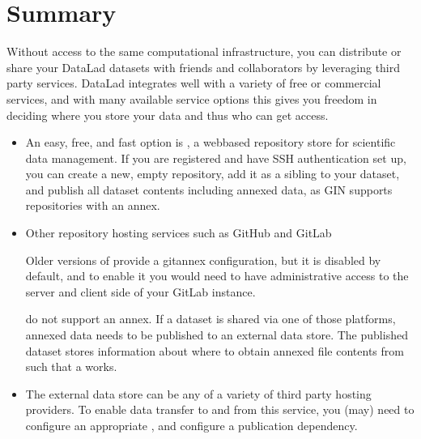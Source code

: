\sphinxstepscope


\section{Summary}
\label{\detokenize{basics/101-140-summary:summary}}\label{\detokenize{basics/101-140-summary:summaryshare}}\label{\detokenize{basics/101-140-summary::doc}}
\sphinxAtStartPar
Without access to the same computational infrastructure, you can distribute or share your
DataLad datasets with friends and collaborators by leveraging third party
services. DataLad integrates well with a variety of free or commercial services,
and with many available service options this gives you freedom in deciding where
you store your data and thus who can get access.
\begin{itemize}
\item {} 
\sphinxAtStartPar
An easy, free, and fast option is {\hyperref[\detokenize{glossary:term-GIN}]{}}, a
web\sphinxhyphen{}based repository store for scientific data management. If you are registered
and have SSH authentication set up, you can create a new, empty repository,
add it as a sibling to your dataset, and publish all dataset contents \textendash{} including
annexed data, as GIN supports repositories with an annex.

\item {} 
\sphinxAtStartPar
Other repository hosting services such as GitHub and GitLab%
\begin{footnote}\sphinxAtStartFootnote
Older versions of {\hyperref[\detokenize{glossary:term-GitLab}]{}} provide a git\sphinxhyphen{}annex configuration, but it is disabled
by default, and to enable it you would need to have administrative
access to the server and client side of your GitLab instance.
%
\end{footnote} do not support
an annex. If a dataset is shared via one of those platforms, annexed data needs
to be published to an external data store. The published dataset stores
information about where to obtain annexed file contents from such that a
 works.

\item {} 
\sphinxAtStartPar
The external data store can be any of a variety of third party hosting providers.
To enable data transfer to and from this service, you (may) need to configure an
appropriate {\hyperref[\detokenize{glossary:term-special-remote}]{}}, and configure a publication dependency.


\end{itemize}
